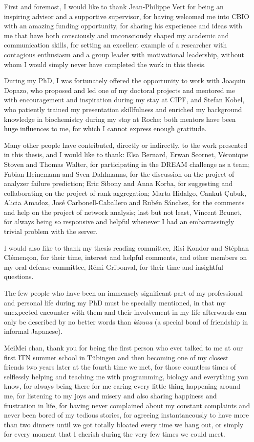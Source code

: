 First and foremost, I would like to thank Jean-Philippe Vert for being an inspiring advisor and a supportive supervisor, for having welcomed me into CBIO with an amazing funding opportunity, for sharing his experience and ideas with me that have both consciously and unconsciously shaped my academic and communication skills, for setting an excellent example of a researcher with contagious enthusiasm and a group leader with motivational leadership, without whom I would simply never have completed the work in this thesis.


During my PhD, I was fortunately offered the opportunity to work with Joaquin Dopazo, who proposed and led one of my doctoral projects and mentored me with encouragement and inspiration during my stay at CIPF, and Stefan Kobel, who patiently trained my presentation skillfulness and enriched my background knowledge in biochemistry during my stay at Roche; both mentors have been huge influences to me, for which I cannot express enough gratitude.


Many other people have contributed, directly or indirectly, to the work presented in this thesis, and I would like to thank: Elsa Bernard, Erwan Scornet, V\'{e}ronique Stoven and Thomas Walter, for participating in the DREAM challenge as a team; Fabian Heinemann and Sven Dahlmanns, for the discussion on the project of analyzer failure prediction; Eric Sibony and Anna Korba, for suggesting and collaborating on the project of rank aggregation; Marta Hidalgo, Cankut \c{C}ubuk, Alicia Amadoz, Jos\'{e} Carbonell-Caballero and Rub\'{e}n S\'{a}nchez, for the comments and help on the project of network analysis; last but not least, Vincent Brunet, for always being so responsive and helpful whenever I had an embarrassingly trivial problem with the server.


I would also like to thank my thesis reading committee, Risi Kondor and St\'{e}phan Cl\'{e}men\c{c}on, for their time, interest and helpful comments, and other members on my oral defense committee, R\'{e}mi Gribonval, for their time and insightful questions.


The few people who have been an immensely significant part of my professional and personal life during my PhD must be specially mentioned, in that my unexpected encounter with them and their involvement in my life afterwards can only be described by no better words than \textit{kizuna} (a special bond of friendship in informal Japanese).


MeiMei chan, thank you for being the first person who ever talked to me at our first ITN summer school in T\"{u}bingen and then becoming one of my closest friends two years later at the fourth time we met, for those countless times of selflessly helping and teaching me with programming, biology and everything you know, for always being there for me caring every little thing happening around me, for listening to my joys and misery and also sharing happiness and frustration in life, for having never complained about my constant complaints and never been bored of my tedious stories, for agreeing instantaneously to have more than two dinners until we got totally bloated every time we hang out, or simply for every moment that I cherish during the very few times we could meet.



